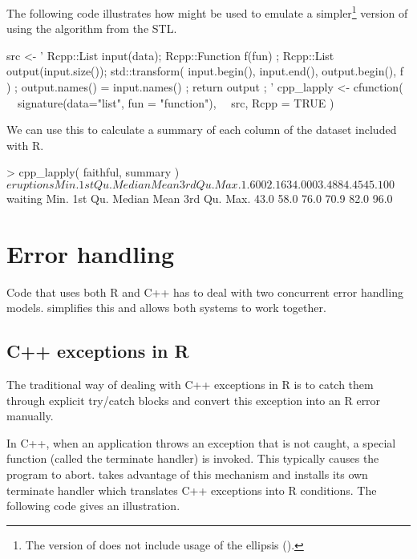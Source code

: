 The following code illustrates how  might be used
to emulate a 
simpler\footnote{The version of  does not include usage of the
ellipsis ().} version of 
using the  algorithm from the STL. 

\begin{example}
src <- '
  Rcpp::List input(data); 
  Rcpp::Function f(fun) ;
  Rcpp::List output(input.size());
  std::transform( 
  	input.begin(), input.end(), 
  	output.begin(), 
  	f ) ;
  output.names() = input.names() ;
  return output ;
  '
cpp_lapply <- cfunction(
\ \ signature(data="list", fun = "function"), 
\ \ src, Rcpp = TRUE )
\end{example}

We can use this to calculate a summary of each 
column of the  dataset included with R.


\begin{example}
> cpp_lapply( faithful, summary )
$eruptions
   Min. 1st Qu.  Median    Mean 3rd Qu.    Max. 
  1.600   2.163   4.000   3.488   4.454   5.100 

$waiting
   Min. 1st Qu.  Median    Mean 3rd Qu.    Max. 
   43.0    58.0    76.0    70.9    82.0    96.0 
\end{example}



\section{Error handling}

Code that uses both R and C++ has to deal with two concurrent
error handling models.  simplifies this and allows both 
systems to work together.

\subsection{C++ exceptions in R}

The traditional way of dealing with C++ exceptions in R is to
catch them through explicit try/catch blocks and
convert this exception into an R error manually. 

In C++, when an application throws an exception that is not caught, 
a special function (called the terminate handler) is invoked. This typically causes 
the program to abort.  takes advantage of this mechanism
and installs its own terminate handler which translates C++
exceptions into R conditions. The following code gives an illustration. 

